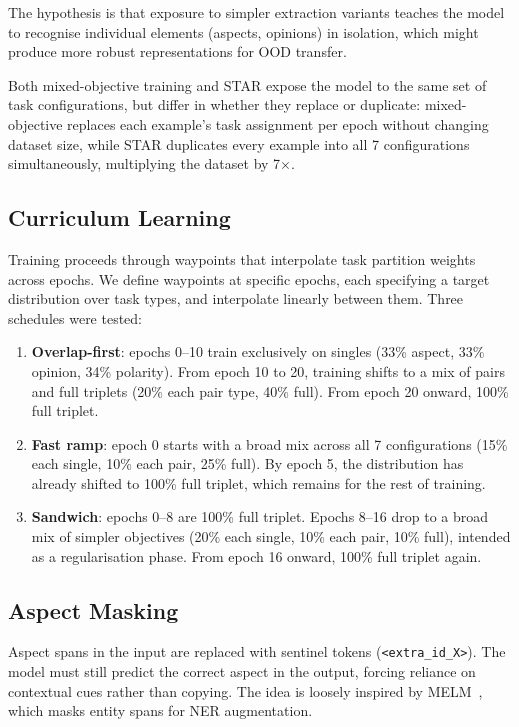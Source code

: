 \documentclass[12pt,a4paper]{report}
\begin{document}
The hypothesis is that exposure to simpler extraction variants teaches the model to recognise individual elements (aspects, opinions) in isolation, which might produce more robust representations for OOD transfer.

Both mixed-objective training and STAR expose the model to the same set of task configurations, but differ in whether they replace or duplicate: mixed-objective replaces each example's task assignment per epoch without changing dataset size, while STAR duplicates every example into all 7 configurations simultaneously, multiplying the dataset by 7$\times$.

\subsection{Curriculum Learning}

Training proceeds through waypoints that interpolate task partition weights across epochs. We define waypoints at specific epochs, each specifying a target distribution over task types, and interpolate linearly between them. Three schedules were tested:

\begin{enumerate}
    \item \textbf{Overlap-first}: epochs 0--10 train exclusively on singles (33\% aspect, 33\% opinion, 34\% polarity). From epoch 10 to 20, training shifts to a mix of pairs and full triplets (20\% each pair type, 40\% full). From epoch 20 onward, 100\% full triplet.
    \item \textbf{Fast ramp}: epoch 0 starts with a broad mix across all 7 configurations (15\% each single, 10\% each pair, 25\% full). By epoch 5, the distribution has already shifted to 100\% full triplet, which remains for the rest of training.
    \item \textbf{Sandwich}: epochs 0--8 are 100\% full triplet. Epochs 8--16 drop to a broad mix of simpler objectives (20\% each single, 10\% each pair, 10\% full), intended as a regularisation phase. From epoch 16 onward, 100\% full triplet again.
\end{enumerate}

\subsection{Aspect Masking}

Aspect spans in the input are replaced with sentinel tokens (\texttt{<extra\_id\_X>}). The model must still predict the correct aspect in the output, forcing reliance on contextual cues rather than copying. The idea is loosely inspired by MELM~\cite{zhou2021melm}, which masks entity spans for NER augmentation.
\end{document}
